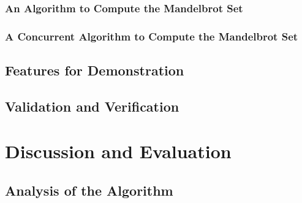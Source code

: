 \subsection{An Algorithm to Compute the Mandelbrot Set}

\subsection{A Concurrent Algorithm to Compute the Mandelbrot Set}

\section{Features for Demonstration}

\section{Validation and Verification}

\chapter{Discussion and Evaluation}
\section{Analysis of the Algorithm}

